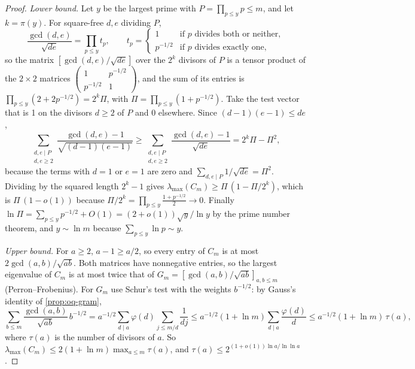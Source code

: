 \begin{proof}
\emph{Lower bound.} Let $y$ be the largest prime with $P = \prod_{p \le y} p \le m$, and let $k = \pi(y)$. For square-free $d, e$ dividing $P$,
\[
  \frac{\gcd(d,e)}{\sqrt{de}} = \prod_{p \le y} t_p, \qquad t_p = \begin{cases} 1 & \text{if } p \text{ divides both or neither,}\\ p^{-1/2} & \text{if } p \text{ divides exactly one,}\end{cases}
\]
so the matrix $[\gcd(d,e)/\sqrt{de}]$ over the $2^k$ divisors of $P$ is a tensor product of the $2 \times 2$ matrices $\left(\begin{smallmatrix} 1 & p^{-1/2}\\ p^{-1/2} & 1\end{smallmatrix}\right)$, and the sum of its entries is $\prod_{p \le y}(2 + 2p^{-1/2}) = 2^k\Pi$, with $\Pi = \prod_{p \le y}(1 + p^{-1/2})$. Take the test vector that is 1 on the divisors $d \ge 2$ of $P$ and 0 elsewhere. Since $(d-1)(e-1) \le de$,
\[
  \sum_{\substack{d, e \mid P\\ d, e \ge 2}}\frac{\gcd(d,e) - 1}{\sqrt{(d-1)(e-1)}} \ge \sum_{\substack{d, e \mid P\\ d, e \ge 2}}\frac{\gcd(d,e) - 1}{\sqrt{de}} = 2^k\Pi - \Pi^2,
\]
because the terms with $d = 1$ or $e = 1$ are zero and $\sum_{d,e\mid P}1/\sqrt{de} = \Pi^2$. Dividing by the squared length $2^k - 1$ gives $\lambda_{\max}(C_m) \ge \Pi\,(1 - \Pi/2^k)$, which is $\Pi\,(1 - o(1))$ because $\Pi/2^k = \prod_{p \le y}\frac{1 + p^{-1/2}}{2} \to 0$. Finally $\ln \Pi = \sum_{p \le y}p^{-1/2} + O(1) = (2 + o(1))\sqrt y/\ln y$ by the prime number theorem, and $y \sim \ln m$ because $\sum_{p \le y}\ln p \sim y$.

\emph{Upper bound.} For $a \ge 2$, $a - 1 \ge a/2$, so every entry of $C_m$ is at most $2\gcd(a,b)/\sqrt{ab}$. Both matrices have nonnegative entries, so the largest eigenvalue of $C_m$ is at most twice that of $G_m = [\gcd(a,b)/\sqrt{ab}]_{a,b \le m}$ (Perron--Frobenius). For $G_m$ use Schur's test with the weights $b^{-1/2}$: by Gauss's identity of \cref{prop:oq-gram},
\[
  \sum_{b \le m}\frac{\gcd(a,b)}{\sqrt{ab}}\,b^{-1/2} = a^{-1/2}\sum_{d \mid a}\varphi(d)\sum_{j \le m/d}\frac{1}{dj} \le a^{-1/2}(1 + \ln m)\sum_{d \mid a}\frac{\varphi(d)}{d} \le a^{-1/2}(1 + \ln m)\,\tau(a),
\]
where $\tau(a)$ is the number of divisors of $a$. So $\lambda_{\max}(C_m) \le 2(1 + \ln m)\max_{a \le m}\tau(a)$, and $\tau(a) \le 2^{(1 + o(1))\ln a/\ln\ln a}$ \citep[Thm.~317]{HardyWright2008}.
\end{proof}

